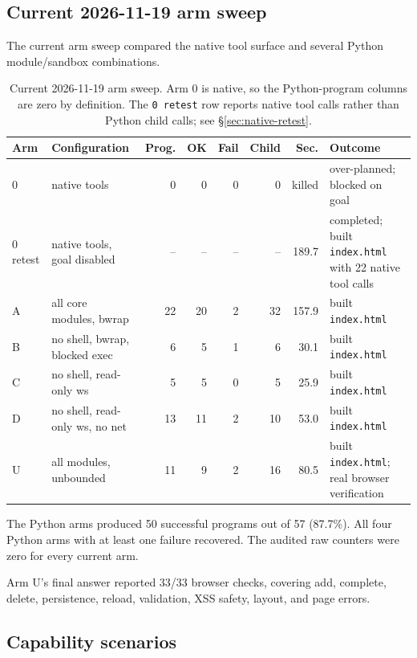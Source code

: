 \documentclass[11pt]{article}
\newcommand{\code}[1]{\texttt{#1}}
\begin{document}
\subsection{Current 2026-11-19 arm sweep}

The current arm sweep compared the native tool surface and several Python
module/sandbox combinations.

\begin{table}[h]
\centering
\small
\begin{tabular}{p{1.1cm}p{4.1cm}rrrrrp{3.4cm}}
\toprule
\textbf{Arm} & \textbf{Configuration} & \textbf{Prog.} & \textbf{OK} & \textbf{Fail} & \textbf{Child} & \textbf{Sec.} & \textbf{Outcome} \\
\midrule
0 & native tools & 0 & 0 & 0 & 0 & killed & over-planned; blocked on goal \\
0 retest & native tools, goal disabled & -- & -- & -- & -- & 189.7 & completed; built \code{index.html} with 22 native tool calls \\
A & all core modules, bwrap & 22 & 20 & 2 & 32 & 157.9 & built \code{index.html} \\
B & no shell, bwrap, blocked exec & 6 & 5 & 1 & 6 & 30.1 & built \code{index.html} \\
C & no shell, read-only ws & 5 & 5 & 0 & 5 & 25.9 & built \code{index.html} \\
D & no shell, read-only ws, no net & 13 & 11 & 2 & 10 & 53.0 & built \code{index.html} \\
U & all modules, unbounded & 11 & 9 & 2 & 16 & 80.5 & built \code{index.html}; real browser verification \\
\bottomrule
\end{tabular}
\caption{Current 2026-11-19 arm sweep.  Arm 0 is native, so the Python-program
columns are zero by definition.  The \code{0 retest} row reports native tool
calls rather than Python child calls; see \S\ref{sec:native-retest}.}
\end{table}

The Python arms produced 50 successful programs out of 57 (87.7\%).  All four
Python arms with at least one failure recovered.  The audited raw counters were
zero for every current arm.

Arm U's final answer reported 33/33 browser checks, covering add, complete,
delete, persistence, reload, validation, XSS safety, layout, and page errors.

\subsection{Capability scenarios}
\end{document}
